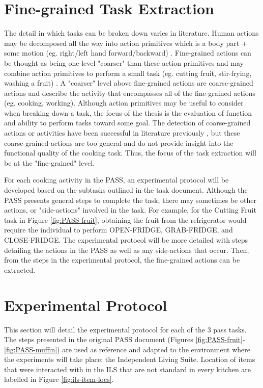 \clearpage
\section{Fine-grained Task Extraction}
The detail in which tasks can be broken down varies in literature. Human actions may be decomposed all the way into action primitives which is a body part + some motion (eg. right/left hand forward/backward) \cite{huszHumanActivityRecognition2007}. Fine-grained actions can be thought as being one level "coarser" than these action primitives and may combine action primitives to perform a small task (eg. cutting fruit, stir-frying, washing a fruit)  \cite{pan_fine-grained_2020}. A "coarser" level above fine-grained actions are coarse-grained actions and describe the activity that encompasses all of the fine-grained actions (eg. cooking, working). Although action primitives may be useful to consider when breaking down a task, the focus of the thesis is the evaluation of function and ability to perform tasks toward some goal. The detection of coarse-grained actions or activities have been successful in literature previously \cite{cook_learning_2010}, but these coarse-grained actions are too general and do not provide insight into the functional quality of the cooking task. Thus, the focus of the task extraction will be at the "fine-grained" level. 

For each cooking activity in the PASS, an experimental protocol will be developed based on the subtasks outlined in the task document. Although the PASS presents general steps to complete the task, there may sometimes be other actions, or "side-actions" involved in the task. For example, for the Cutting Fruit task in Figure \ref{fig:PASS-fruit}, obtaining the fruit from the refrigerator would require the individual to perform OPEN-FRIDGE, GRAB-FRIDGE, and CLOSE-FRIDGE. The experimental protocol will be more detailed with steps detailing the actions in the PASS as well as any side-actions that occur. Then, from the steps in the experimental protocol, the fine-grained actions can be extracted.

\section{Experimental Protocol}\label{sec:pass-experimental-protocol}
This section will detail the experimental protocol for each of the 3 pass tasks. The steps presented in the original PASS document (Figures \ref{fig:PASS-fruit}-\ref{fig:PASS-muffin}) are used as reference and adapted to the environment where the experiments will take place: the Independent Living Suite. Location of items that were interacted with in the ILS that are not standard in every kitchen are labelled in Figure \ref{fig:ils-item-locs}.

